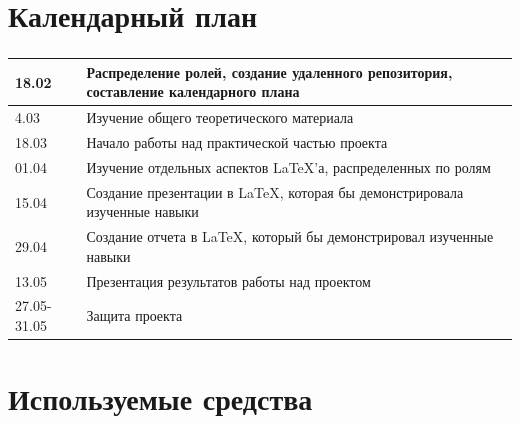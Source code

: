 \documentclass[russian, 14pt]{beamer}
\begin{document}
\section{Календарный план}

\begin{frame} \label{tab}
	\frametitle{\insertsection}
	\small{
	\begin{tabular}{|l|p{}|}
		\hline
		\rowcolor{Mycolor1}
		18.02 & Распределение ролей, создание удаленного репозитория, составление календарного плана \\
		\hline
		4.03 & Изучение общего теоретического материала \\
		\hline
		\rowcolor{Mycolor1}
		18.03 & Начало работы над практической частью проекта \\
		\hline
		01.04 & Изучение отдельных аспектов \LaTeX’а, распределенных по ролям \\
		\hline
		\rowcolor{Mycolor1}
		15.04 & Создание презентации в \LaTeX, которая бы демонстрировала изученные навыки \\
		\hline
		29.04 & Создание отчета в \LaTeX, который бы демонстрировал изученные навыки
		\\
		\hline
		\rowcolor{Mycolor1}
		13.05 & Презентация результатов работы над проектом \\
		\hline
		27.05-31.05 & Защита проекта \\
		\hline
	\end{tabular}
	\hyperlink{button}{}
}
\end{frame}

\section{Используемые средства}
\end{document}
